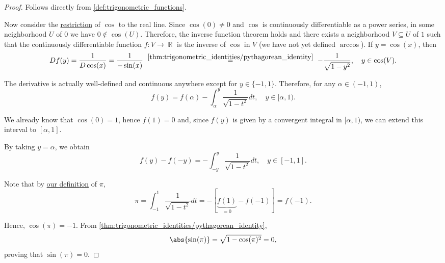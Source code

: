 \begin{proof}
   Follows directly from \cref{def:trigonometric_functions}.

   Now consider the \hyperref[def:set_valued_map/restriction]{restriction} of \( \cos \) to the real line. Since \( \cos(0) \neq 0 \) and \( \cos \) is continuously differentiable as a power series, in some neighborhood \( U \) of \( 0 \) we have \( 0 \not\in \cos(U) \). Therefore, the inverse function theorem holds and there exists a neighborhood \( V \subseteq U \) of \( 1 \) such that the continuously differentiable function \( f: V \to \BbbR \) is the inverse of \( \cos \) in \( V \) (we have not yet defined \hyperref[def:inverse_trigonometric_functions/arccos]{\( \arccos \)}). If \( y = \cos(x) \), then
  \begin{equation*}
    Df(y)
    =
    \frac 1 {D\cos(x)}
    =
    \frac 1 {-\sin(x)}
    \reloset {\ref{thm:trigonometric_identities/pythagorean_identity}} =
    -\frac 1 {\sqrt{1 - y^2}},
    \quad y \in \cos(V).
  \end{equation*}

  The derivative is actually well-defined and continuous anywhere except for \( y \in \{ -1, 1 \} \). Therefore, for any \( \alpha \in (-1, 1) \),
  \begin{equation*}
    f(y) = f(\alpha) - \int_{\alpha}^y \frac 1 {\sqrt{1 - t^2}} dt, \quad y \in [\alpha, 1).
  \end{equation*}

  We already know that \( \cos(0) = 1 \), hence \( f(1) = 0 \) and, since \( f(y) \) is given by a convergent integral in \( [\alpha, 1) \), we can extend this interval to \( [\alpha, 1] \).

  By taking \( y = \alpha \), we obtain
  \begin{equation*}
    f(y) - f(-y) = -\int_{-y}^y \frac 1 {\sqrt{1 - t^2}} dt, \quad y \in [-1, 1].
  \end{equation*}

  Note that by \hyperref[def:pi]{our definition} of \( \pi \),
  \begin{equation*}
    \pi
    =
    \int_{-1}^1 \frac 1 {\sqrt{1 - t^2}} dt
    =
    -[\underbrace{f(1)}_{=0} - f(-1)]
    =
    f(-1).
  \end{equation*}

  Hence, \( \cos(\pi) = -1 \). From \cref{thm:trigonometric_identities/pythagorean_identity},
  \begin{equation*}
    \abs{\sin(\pi)} = \sqrt{1 - \cos(\pi)^2} = 0,
  \end{equation*}
  proving that \( \sin(\pi) = 0 \).


\end{proof}
